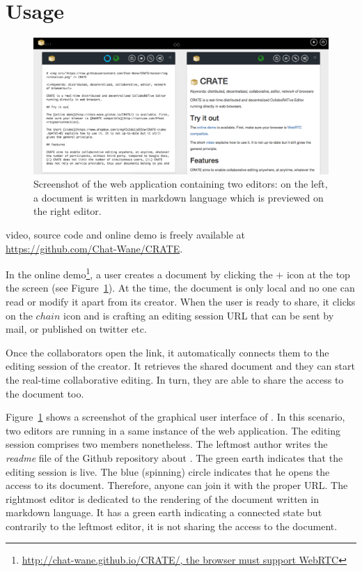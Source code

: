 
\section{Usage}
\label{sec:usage}

\begin{figure}
  \includegraphics[width=\textwidth]{./img/screenshot.png}
  \caption{\label{img:screenshot} Screenshot of the web application containing
    two editors: on the left, a document is written in markdown language which
    is previewed on the right editor.}
\end{figure}

\CRATE video, source code and online demo is freely available at
\url{https://github.com/Chat-Wane/CRATE}.


In the online demo\footnote{\url{http://chat-wane.github.io/CRATE/, the
    browser must support WebRTC}}, a user creates a document by
clicking the $+$ icon at the top the screen (see
Figure~\ref{img:screenshot}). At the time, the document is only local
and no one can read or modify it apart from its creator. When the user
is ready to share, it clicks on the $chain$ icon and \CRATE is
crafting an editing session URL that can be sent by mail, or published
on twitter etc.

Once the collaborators open the link, it automatically connects them
to the editing session of the creator. It retrieves the shared
document and they can start the real-time collaborative editing. In
turn, they are able to share the access to the document too. 

Figure~\ref{img:screenshot} shows a screenshot of the graphical user interface
of \CRATE. In this scenario, two editors are running in a same instance of the
web application. The editing session comprises two members nonetheless. The
leftmost author writes the \emph{readme} file of the Github repository about
\CRATE. The green earth indicates that the editing session is live. The blue
(spinning) circle indicates that he opens the access to its document. Therefore,
anyone can join it with the proper URL. The rightmost editor is dedicated to the
rendering of the document written in markdown language. It has a green earth
indicating a connected state but contrarily to the leftmost editor, it is not
sharing the access to the document.

